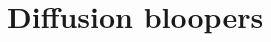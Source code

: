 \documentclass[12pt,a4paper,oneside]{book} %
\begin{document}





\appendix
\chapter{Diffusion bloopers}

\backmatter
\printbibliography
\end{document}
